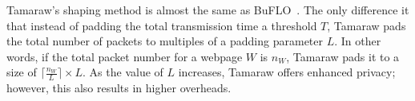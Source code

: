 Tamaraw's shaping method is almost the same as BuFLO~\cite{dyer2012peek}. The only difference it that instead of padding the total transmission time a threshold $T$, Tamaraw pads the total number of packets to multiples of a padding parameter $L$.
In other words, if the total packet number for a webpage $W$ is $n_W$, Tamaraw pads it to a size of $\lceil \frac{n_W}{L} \rceil \times L$.
As the value of $L$ increases, Tamaraw offers enhanced privacy; however, this also results in higher overheads.






